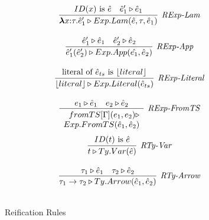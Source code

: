 \begin{figure}[t]
\begin{minipage}{.47\textwidth}
\[\begin{array}{c}
\infer[\textit{RExp-Lam}]
	{ \boldsymbol\lambda x{:}\tau . \hat{e}'_1 \triangleright Exp.Lam( \hat{e}, \tau, \hat{e}_1 )  }
	{ID(x)\ \text{is}\ \hat{e} & \hat{e}'_1 \triangleright \hat{e}_1  } \\[3ex]

\infer[\textit{RExp-App}]
	{ \hat{e}'_1(\hat{e}'_2)  \triangleright Exp.App(\hat{e_1},\hat{e}_2) }
	{ \hat{e}'_1 \triangleright \hat{e}_1  & \hat{e}'_2 \triangleright \hat{e}_2   } \\[3ex]

\infer[\textit{RExp-Literal}]
	{ \lfloor literal \rfloor \triangleright Exp.Literal( \hat{e}_{ts} )  }
	{ \text{literal of}\ \hat{e}_{ts}\ \text{is}\ \lfloor literal \rfloor  } \\[3ex]

\infer[\textit{RExp-FromTS}]
          {\renewcommand{\arraystretch}{1}
	    \begin{array}{r}
	    fromTS[\Gamma](e_1,e_2) \triangleright\\
           Exp.FromTS(\hat{e}_1,\hat{e}_2)
            \end{array}
       }
	  {e_1 \triangleright \hat{e}_1 & e_2 \triangleright \hat{e}_2  }
	   \\[3ex] 

\infer[\textit{RTy-Var}]
	{ t \triangleright Ty.Var(\hat{e})   }
	{ ID(t)\ \text{is}\ \hat{e}} \\[3ex]

\infer[\textit{RTy-Arrow}]
	{ \tau_1 \rightarrow \tau_2 \triangleright Ty.Arrow(\hat{e}_1,\hat{e}_2 )  }
	{ \tau_1 \triangleright \hat{e}_1 & \tau_2 \triangleright \hat{e}_2 } \\[3ex]
\end{array}
\]
\label{fig:reification}
\caption{Reification Rules}
\end{minipage}
\vspace{-15px}
\end{figure}

